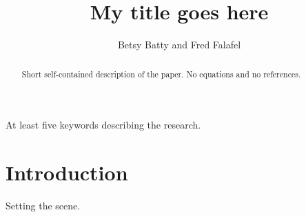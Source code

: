 \documentclass[a4paper,11pt]{article}
\title{My title goes here}
\author{Betsy Batty and Fred Falafel}
\begin{document}
\titlepage

\begin{abstract}
Short self-contained description of the paper. No equations and no references.
\end{abstract}

\begin{keywords} At least five keywords describing the research.
\end{keywords}

\newpage

\section{Introduction}

Setting the scene.

\newpage

\printbibliography
\end{document}
